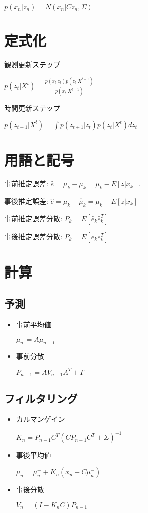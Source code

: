 \documentclass[letterpaper,10pt,dvipdfmx]{sphinxmanual}
\begin{document}
\(p(x_{n}|z_{n})=N(x_{n}|Cz_{n},\Sigma)\)


\section{定式化}
\label{docs/about_kalman:id4}
観測更新ステップ

\(p(z_{t}|X^{t})=\frac{p(x_{t}|z_{t})p(z_{t}|X^{t-1})}{p(x_{t}|X^{t-1})}\)

時間更新ステップ

\(p(z_{t+1}|X^{t})=\int p(z_{t+1}|z_{t})p(z_{t}|X^{t}) dz_{t}\)


\section{用語と記号}
\label{docs/about_kalman:id5}
事前推定誤差: \(\hat{e} = \mu_{k} - \bar{\mu}_{k} = \mu_{k} - E[z|x_{k-1}]\)

事後推定誤差: \(\hat{e} = \mu_{k} - \hat{\mu}_{k} = \mu_{k} - E[z|x_{k}]\)

事前推定誤差分散: \(P_{k} = E[\hat{e}_{k} \hat{e}_{k}^{T}]\)

事後推定誤差分散: \(P_{k} = E[e_{k} e_{k}^{T}]\)


\section{計算}
\label{docs/about_kalman:id6}

\subsection{予測}
\label{docs/about_kalman:id7}\begin{itemize}
\item {} 
事前平均値

\(\mu_{n}^{-} = A \mu_{n-1}\)

\item {} 
事前分散

\(P_{n-1}=A V_{n-1} A^{T} + \Gamma\)

\end{itemize}


\subsection{フィルタリング}
\label{docs/about_kalman:id8}\begin{itemize}
\item {} 
カルマンゲイン

\(K_{n}=P_{n-1}C^{T}(CP_{n-1}C^{T}+\Sigma)^{-1}\)

\item {} 
事後平均値

\(\mu_{n}=\mu_{n}^{-} +K_{n}(x_{n}-C \mu_{n}^{-})\)

\item {} 
事後分散

\(V_{n}=(I-K_{n}C)P_{n-1}\)

\end{itemize}
\end{document}
